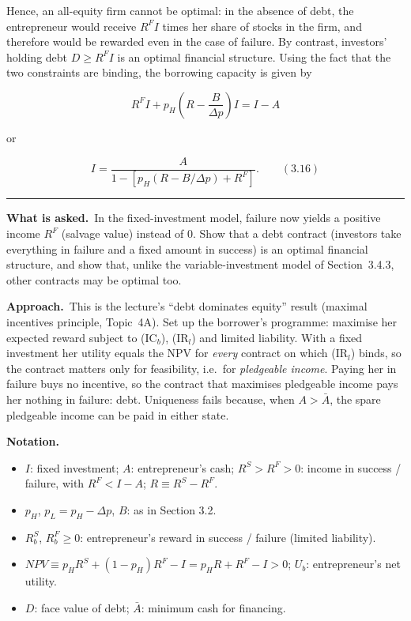 \documentclass[11pt,a4paper]{article}
\newcommand{\notation}{\par\noindent\textbf{Notation.}}
\newcommand{\asked}{\par\medskip\noindent\textbf{What is asked.}~}
\newcommand{\approach}{\par\smallskip\noindent\textbf{Approach.}~}
\newcommand{\stmtend}{\par\endgroup\nopagebreak\noindent\rule{\linewidth}{0.4pt}\par\medskip}
\begin{document}
Hence, an all-equity firm cannot be optimal: in the absence of debt, the entrepreneur would receive
\(R^F I\) times her share of stocks in the firm, and therefore would be rewarded even in the case of
failure. By contrast, investors' holding debt \(D \geqslant R^F I\) is an optimal financial
structure. Using the fact that the two constraints are binding, the borrowing capacity is given by

\[R^F I + p_H\left(R - \frac{B}{\Delta p}\right) I = I - A\]

or

\[I = \frac{A}{1 - [p_H(R - B/\Delta p) + R^F]}. \qquad (3.16)\]
\stmtend

\asked In the fixed-investment model, failure now yields a positive income $R^F$ (salvage value)
instead of $0$. Show that a debt contract (investors take everything in failure and a fixed amount
in success) is an optimal financial structure, and show that, unlike the variable-investment model
of Section~3.4.3, other contracts may be optimal too.

\approach This is the lecture's ``debt dominates equity'' result (maximal incentives principle,
Topic~4A). Set up the borrower's programme: maximise her expected reward subject to (IC$_b$),
(IR$_l$) and limited liability. With a fixed investment her utility equals the NPV for \emph{every}
contract on which (IR$_l$) binds, so the contract matters only for feasibility, i.e.\ for
\emph{pledgeable income}. Paying her in failure buys no incentive, so the contract that maximises
pledgeable income pays her nothing in failure: debt. Uniqueness fails because, when $A>\bar A$, the
spare pledgeable income can be paid in either state.

\notation
\begin{itemize}
  \item $I$: fixed investment; $A$: entrepreneur's cash; $R^S>R^F>0$: income in success / failure,
        with $R^F<I-A$; $R\equiv R^S-R^F$.
  \item $p_H$, $p_L=p_H-\Delta p$, $B$: as in Section 3.2.
  \item $R_b^S$, $R_b^F\ge0$: entrepreneur's reward in success / failure (limited liability).
  \item $\mathit{NPV}\equiv p_HR^S+(1-p_H)R^F-I=p_HR+R^F-I>0$; $U_b$: entrepreneur's net utility.
  \item $D$: face value of debt; $\bar A$: minimum cash for financing.
\end{itemize}
\end{document}
